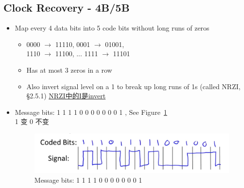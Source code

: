 \documentclass[12pt]{ctexart}   %
\begin{document}
	 \subsection{Clock  Recovery - 4B/5B}
	 \begin{itemize}
	 	\item Map every 4 data bits into 5 code bits without long runs of zeros
	 	\begin{itemize}
	 		\item 0000 $ \rightarrow$ 11110, 0001 $\rightarrow$ 01001, \\
	 				1110 $ \rightarrow$ 11100, ... 1111 $\rightarrow$ 11101 
	 		\item Has at most 3 zeros in a row
	 		\item Also invert signal level on a 1 to break up long runs of 1s (called NRZI, §2.5.1) \underline{NRZI中的I是invert}
	 	\end{itemize}
	 	
	 	\item Message bits: 1 1 1 1 0 0 0 0 0 0 0 1   , See Figure~\ref{fig:2-4-5} \\
	 	1 变 0 不变
	 	\begin{figure}[h!] %
		 \centering
		 \includegraphics[scale=0.7]{images/2-4-5}
		\caption{ Message bits: 1 1 1 1 0 0 0 0 0 0 0 1}
		 \label{fig:2-4-5}
		 \end{figure}
	 \end{itemize}
	 
\end{document}

